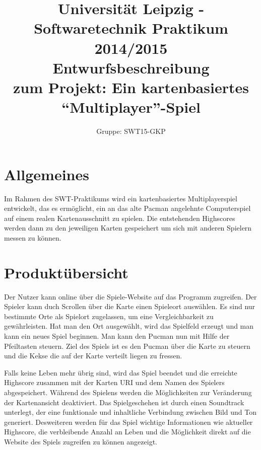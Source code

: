 \documentclass[11pt,a4paper]{article}
\author{Gruppe: SWT15-GKP}
\title{Universität Leipzig - Softwaretechnik Praktikum 2014/2015 \\  Entwurfsbeschreibung \\ zum Projekt: Ein kartenbasiertes “Multiplayer”-Spiel}
\begin{document}
\maketitle


\tableofcontents

\clearpage

\section{Allgemeines}
Im Rahmen des SWT-Praktikums wird ein kartenbasiertes Multiplayerspiel entwickelt, das es ermöglicht, ein an das alte Pacman angelehnte Computerspiel auf einem realen Kartenausschnitt zu spielen. Die entstehenden Highscores werden dann zu den jeweiligen Karten gespeichert um sich mit anderen Spielern messen zu können.


\section{Produktübersicht}
Der Nutzer kann online über die Spiele-Website auf das Programm zugreifen.
Der Spieler kann duch Scrollen über die Karte einen Spieleort auswählen. Es sind nur bestimmte Orte als Spielort zugelassen, um eine Vergleichbarkeit zu gewährleisten.
Hat man den Ort ausgewählt, wird das Spielfeld erzeugt und man kann ein neues Spiel beginnen. 
Man kann den Pucman nun mit Hilfe der Pfeiltasten steuern.
Ziel des Spiels ist es den Pucman über die Karte zu steuern und die Kekse die auf der Karte verteilt liegen zu fressen. 

Falls keine Leben mehr übrig sind, wird das Spiel beendet und die erreichte Highscore zusammen mit der Karten URI und dem Namen des Spielers abgespeichert.
Während des Spielens werden die Möglichkeiten zur Veränderung der Kartenansicht deaktiviert. 
Das Spielgeschehen ist durch einen Soundtrack unterlegt, der eine funktionale und inhaltliche Verbindung zwischen Bild und Ton generiert.
Desweiteren werden für das Spiel wichtige Informationen wie aktueller Highscore, die verbleibende Anzahl an Leben und die Möglichkeit direkt auf die Website des Spiels zugreifen zu können angezeigt.
\clearpage
\end{document}
